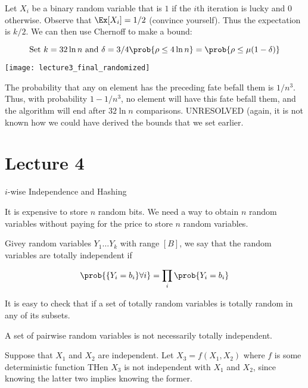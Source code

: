 \documentclass[../main.tex]{subfiles}
\begin{document}
\begin{example}
    Let $X_{i}$ be a binary random variable that is $1$ if the $i$th iteration is lucky and $0$ otherwise. Observe that
    $\Ex[X_{i}] = 1/2$ (convince yourself). Thus the expectation is $k/2$. We can then use Chernoff to make a bound:

    \[
        \text{Set $k = 32 \ln n$ and $\delta = 3/4$} \\
        \prob{\rho \leq 4\ln n} = \prob{\rho \leq \mu(1 - \delta)} \\
    \]


    \begin{center}
        \texttt{[image: lecture3\_final\_randomized]}
    \end{center}

    The probability that any on element has the preceding fate befall them is $1/n^3$. Thus, with probability $1 - 1/n^3$, no element will have this fate befall them, and the algorithm will end after $32 \ln n$ comparisons. UNRESOLVED (again, it is not known how we could have derived the bounds that we set earlier.
\end{example}




\section{Lecture 4}{$i$-wise Independence and Hashing}
\begin{remark}
    It is expensive to store $n$ random bits. We need a way to obtain $n$ random variables
    without paying for the price to store $n$ random variables.
\end{remark}

\begin{definition}
    Givey random variables $Y_1 \dots Y_k$ with range $[B]$, we say that the random variables
    are totally independent if 

    \[
        \prob{\{Y_i = b_i\} \forall i} = \prod_{i} \prob{Y_{i} = b_{i}}
    \]
\end{definition}

\begin{lemma}
    It is easy to check that if a set of totally random variables is totally random in
    any of its subsets.
\end{lemma}

\begin{example}
    A set of pairwise random variables is not necessarily totally independent.

    Suppose that $X_1$ and $X_2$ are independent. Let $X_3 = f(X_1, X_2)$ where
    $f$ is some deterministic function THen $X_3$ is not independent with
    $X_1$ and $X_2$, since knowing the latter two implies knowing the former.
\end{example}
\end{document}
